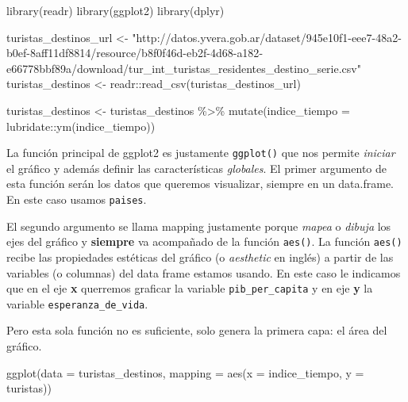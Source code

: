 \documentclass[
  openany]{book}
\newenvironment{Shaded}{\begin{snugshade}}{\end{snugshade}}
\newcommand{\AttributeTok}[1]{\textcolor[rgb]{0.77,0.63,0.00}{#1}}
\newcommand{\FunctionTok}[1]{\textcolor[rgb]{0.00,0.00,0.00}{#1}}
\newcommand{\NormalTok}[1]{#1}
\newcommand{\OtherTok}[1]{\textcolor[rgb]{0.56,0.35,0.01}{#1}}
\newcommand{\SpecialCharTok}[1]{\textcolor[rgb]{0.00,0.00,0.00}{#1}}
\newcommand{\StringTok}[1]{\textcolor[rgb]{0.31,0.60,0.02}{#1}}
\begin{document}
\begin{Shaded}
\begin{Highlighting}[]
\FunctionTok{library}\NormalTok{(readr)}
\FunctionTok{library}\NormalTok{(ggplot2)}
\FunctionTok{library}\NormalTok{(dplyr)}

\NormalTok{turistas\_destinos\_url }\OtherTok{\textless{}{-}} \StringTok{"http://datos.yvera.gob.ar/dataset/945e10f1{-}eee7{-}48a2{-}b0ef{-}8aff11df8814/resource/b8f0f46d{-}eb2f{-}4d68{-}a182{-}e66778bbf89a/download/tur\_int\_turistas\_residentes\_destino\_serie.csv"}
\NormalTok{turistas\_destinos }\OtherTok{\textless{}{-}}\NormalTok{ readr}\SpecialCharTok{::}\FunctionTok{read\_csv}\NormalTok{(turistas\_destinos\_url)}

\NormalTok{turistas\_destinos }\OtherTok{\textless{}{-}}\NormalTok{ turistas\_destinos }\SpecialCharTok{\%\textgreater{}\%} 
  \FunctionTok{mutate}\NormalTok{(}\AttributeTok{indice\_tiempo =}\NormalTok{ lubridate}\SpecialCharTok{::}\FunctionTok{ym}\NormalTok{(indice\_tiempo))}
\end{Highlighting}
\end{Shaded}

La función principal de ggplot2 es justamente \texttt{ggplot()} que nos permite \emph{iniciar} el gráfico y además definir las características \emph{globales}.
El primer argumento de esta función serán los datos que queremos visualizar, siempre en un data.frame.
En este caso usamos \texttt{paises}.

El segundo argumento se llama mapping justamente porque \emph{mapea} o \emph{dibuja} los ejes del gráfico y \textbf{siempre} va acompañado de la función \texttt{aes()}.
La función \texttt{aes()} recibe las propiedades estéticas del gráfico (o \emph{aesthetic} en inglés) a partir de las variables (o columnas) del data frame estamos usando.
En este caso le indicamos que en el eje \textbf{x} querremos graficar la variable \texttt{pib\_per\_capita} y en eje \textbf{y} la variable \texttt{esperanza\_de\_vida}.

Pero esta sola función no es suficiente, solo genera la primera capa: el área del gráfico.

\begin{Shaded}
\begin{Highlighting}[]
\FunctionTok{ggplot}\NormalTok{(}\AttributeTok{data =}\NormalTok{ turistas\_destinos, }\AttributeTok{mapping =} \FunctionTok{aes}\NormalTok{(}\AttributeTok{x =}\NormalTok{ indice\_tiempo, }\AttributeTok{y =}\NormalTok{ turistas))}
\end{Highlighting}
\end{Shaded}
\end{document}
